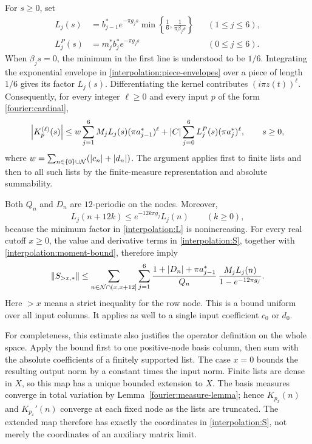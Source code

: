 For $s\ge0$, set
\begin{equation}\label{interpolation:L}
 \begin{aligned}
 L_j(s)&=b_{j-1}^*e^{-\pi g_js}
       \min\left\{\frac16,\frac{1}{\pi\beta_js}\right\}
       &&(1\le j\le6),\\
 L_j^P(s)&=m_j^*b_j^*e^{-\pi g_js}
       &&(0\le j\le6).
 \end{aligned}
\end{equation}
When $\beta_js=0$, the minimum in the first line is understood to be
$1/6$.  Integrating the exponential envelope in
\eqref{interpolation:piece-envelopes} over a piece of length $1/6$ gives
its factor $L_j(s)$.  Differentiating the kernel contributes
$(i\pi z(t))^\ell$.  Consequently, for every integer $\ell\ge0$ and every
input $p$ of the form \eqref{fourier:cardinal},
\begin{equation}\label{interpolation:moment-bound}
 \left\lvert K_p^{(\ell)}(s)\right\rvert
 \le w\sum_{j=1}^6 M_jL_j(s)(\pi a_{j-1}^*)^\ell
      +\left\lvert C\right\rvert\sum_{j=0}^6L_j^P(s)(\pi a_j^*)^\ell,
 \qquad s\ge0,
\end{equation}
where $w=\sum_{n\in\{0\}\cup\mathcal N}(\left\lvert c_n\right\rvert+\left\lvert d_n\right\rvert)$.
The argument applies first to finite lists and then to all such lists by
the finite-measure representation and absolute summability.

Both $Q_n$ and $D_n$ are $12$-periodic on the nodes.  Moreover,
\[
 L_j(n+12k)\le e^{-12k\pi g_j}L_j(n)\qquad(k\ge0),
\]
because the minimum factor in \eqref{interpolation:L} is nonincreasing.
For every real cutoff $x\ge0$, the value and derivative terms in
\eqref{interpolation:S}, together with
\eqref{interpolation:moment-bound}, therefore imply
\begin{equation}\label{interpolation:row-envelope}
 \left\lVert S_{>x,*}\right\rVert
 \le
 \sum_{n\in\mathcal N\cap(x,x+12]}
 \sum_{j=1}^6
 \frac{1+\left\lvert D_n\right\rvert+\pi a_{j-1}^*}{Q_n}\,
 \frac{M_jL_j(n)}{1-e^{-12\pi g_j}}.
\end{equation}
Here $>x$ means a strict inequality for the row node.  This is a bound
uniform over all input columns.  It applies as well to a single input coefficient
$c_0$ or $d_0$.

For completeness, this estimate also justifies the operator definition on
the whole space.  Apply the bound first to one positive-node basis column,
then sum with the absolute coefficients of a finitely supported list.
The case $x=0$ bounds the resulting output norm by a constant times the
input norm.  Finite lists are dense in $X$, so this map has a unique bounded
extension to $X$.  The basis measures converge in total variation by
Lemma~\ref{fourier:measure-lemma}; hence $K_{p_x}(n)$ and $K_{p_x}'(n)$
converge at each fixed node as the lists are truncated.  The extended map
therefore has exactly the coordinates in \eqref{interpolation:S}, not merely
the coordinates of an auxiliary matrix limit.

